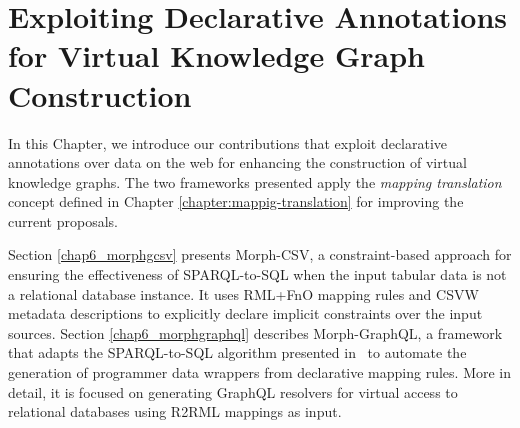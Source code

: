 
\chapter{Exploiting Declarative Annotations for Virtual Knowledge Graph Construction}
\label{chapter:virtual}

In this Chapter, we introduce our contributions that exploit declarative annotations over data on the web for enhancing the construction of virtual knowledge graphs. The two frameworks presented apply the \textit{mapping translation} concept defined in Chapter \ref{chapter:mappig-translation} for improving the current proposals. 

Section \ref{chap6_morphgcsv} presents Morph-CSV, a constraint-based approach for ensuring the effectiveness of SPARQL-to-SQL when the input tabular data is not a relational database instance. It uses RML+FnO mapping rules and CSVW metadata descriptions to explicitly declare implicit constraints over the input sources. Section \ref{chap6_morphgraphql} describes Morph-GraphQL, a framework that adapts the SPARQL-to-SQL algorithm presented in~\citep{chebotko2009semantics} to automate the generation of programmer data wrappers from declarative mapping rules. More in detail, it is focused on generating GraphQL resolvers for virtual access to relational databases using R2RML mappings as input.



